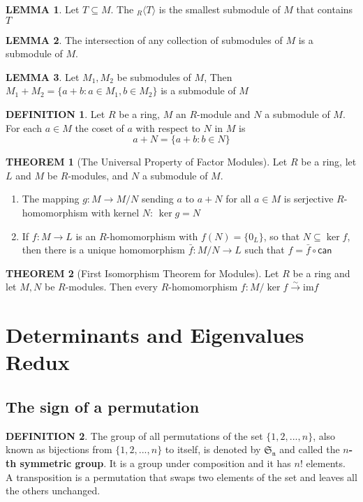 \documentclass[12pt]{article}
\theoremstyle{definition}
\newtheorem{definition}{DEFINITION}[subsection]
\newtheorem{theorem}{THEOREM}[subsection]
\newcommand{\image}{\text{im}}
\newtheorem{lemma}{LEMMA}[subsection]
\begin{document}
\begin{lemma}
    Let $T\subseteq M$. The $_R\langle T\rangle$ is the smallest submodule of $M$ that contains $T$
\end{lemma}

\begin{lemma}
    The intersection of any collection of submodules of $M$ is a submodule of $M$.
\end{lemma}

\begin{lemma}
    Let $M_1, M_2$ be submodules of $M$, Then $M_1 + M_2 = \{a+b:a\in M_1, b\in M_2\}$ is a submodule of $M$
\end{lemma}

\begin{definition}
    Let $R$ be a ring, $M$ an $R$-module and $N$ a submodule of $M$. For each $a \in M$ the coset of $a$ with respect to $N$ in $M$ is
    $$a+N = \{a+b:b\in N\}$$
\end{definition}

\begin{theorem}[The Universal Property of Factor Modules]
    Let $R$ be a ring, let $L$ and $M$ be $R$-modules, and $N$ a submodule of $M$.
    \begin{enumerate}
        \item The mapping $g: M \rightarrow M/N$ sending $a$ to $a+N$ for all $a \in M$ is serjective $R$-homomorphism with kernel $N$: $\ker{g} = N$
        \item If $f:M \rightarrow L$ is an $R$-homomorphism with $f(N) = \{0_L\}$, so that $N \subseteq \ker f$, then there is a unique homomorphism $\bar{f}:M/N \rightarrow L$ such that $f = \bar{f}\circ \mathsf{can}$
    \end{enumerate}
\end{theorem}

\begin{theorem}[First Isomorphism Theorem for Modules]
    Let $R$ be a ring and let $M,N$ be $R$-modules. Then every $R$-homomorphism $f:M/\ker f \stackrel{\sim}{\rightarrow} \image f$
\end{theorem}


\section{Determinants and Eigenvalues Redux}
\subsection{The sign of a permutation}
\begin{definition}
    The group of all permutations of the set $\{1,2,...,n\}$, also known as bijections from $\{1,2,...,n\}$ to itself, is denoted by $\mathfrak{S_n}$ and called the $n$\textbf{-th symmetric group}. It is a group under composition and it has $n!$ elements.\\
    A transposition is a permutation that swaps two elements of the set and leaves all the others unchanged.
\end{definition}
\end{document}

